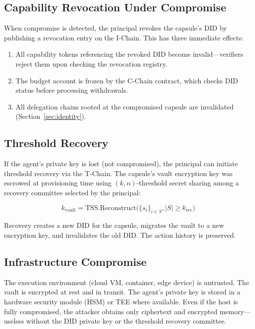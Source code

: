 \documentclass[11pt,a4paper]{article}
\begin{document}
\subsection{Capability Revocation Under Compromise}

When compromise is detected, the principal revokes the capsule's DID by publishing a revocation entry on the I-Chain. This has three immediate effects:

\begin{enumerate}
    \item All capability tokens referencing the revoked DID become invalid---verifiers reject them upon checking the revocation registry.
    \item The budget account is frozen by the C-Chain contract, which checks DID status before processing withdrawals.
    \item All delegation chains rooted at the compromised capsule are invalidated (Section~\ref{sec:identity}).
\end{enumerate}

\subsection{Threshold Recovery}

If the agent's private key is lost (not compromised), the principal can initiate threshold recovery via the T-Chain. The capsule's vault encryption key was escrowed at provisioning time using $(k, n)$-threshold secret sharing among a recovery committee selected by the principal:

\begin{equation}\label{eq:recovery}
    k_{\text{vault}} = \text{TSS.Reconstruct}\big(\{s_i\}_{i \in S}, |S| \geq k_{\text{rec}}\big)
\end{equation}

Recovery creates a new DID for the capsule, migrates the vault to a new encryption key, and invalidates the old DID. The action history is preserved.

\subsection{Infrastructure Compromise}

The execution environment (cloud VM, container, edge device) is untrusted. The vault is encrypted at rest and in transit. The agent's private key is stored in a hardware security module (HSM) or TEE where available. Even if the host is fully compromised, the attacker obtains only ciphertext and encrypted memory---useless without the DID private key or the threshold recovery committee.
\end{document}
